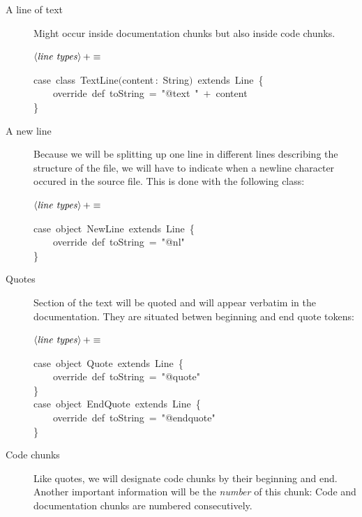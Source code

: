 \documentclass[a4paper,12pt]{article}
\begin{document}
\begin{description}
\item[A line of text] Might occur inside documentation chunks but also
inside code chunks.

$\left<\mbox{\emph{line types}}\right>+\equiv$
\begin{program}{\vem case}~{\vem class}~TextLine$($content\,{\rm :}~String$)$~{\vem extends}~Line~{\small\{}
\\~~~~{\vem override}~{\vem def}~toString~=~"@text~"~$+$~content
\\{\small\}}
\\[0.5em]\end{program}
\item[A new line] Because we will be splitting up one line in different lines
describing the structure of the file, we will have to indicate when a newline
character occured in the source file. This is done with the following class:

$\left<\mbox{\emph{line types}}\right>+\equiv$
\begin{program}{\vem case}~{\vem object}~NewLine~{\vem extends}~Line~{\small\{}
\\~~~~{\vem override}~{\vem def}~toString~=~"@nl"
\\{\small\}}
\\[0.5em]\end{program}
\item[Quotes] Section of the text will be quoted and will appear verbatim
in the documentation. They are situated betwen beginning and end quote tokens:

$\left<\mbox{\emph{line types}}\right>+\equiv$
\begin{program}{\vem case}~{\vem object}~Quote~{\vem extends}~Line~{\small\{}
\\~~~~{\vem override}~{\vem def}~toString~=~"@quote"
\\{\small\}}
\\{\vem case}~{\vem object}~EndQuote~{\vem extends}~Line~{\small\{}
\\~~~~{\vem override}~{\vem def}~toString~=~"@endquote"
\\{\small\}}
\\[0.5em]\end{program}
\item[Code chunks] Like quotes, we will designate code chunks by their
beginning and end. Another important information will be the \emph{number} of
this chunk: Code and documentation chunks are numbered consecutively.


\end{description}
\end{document}
